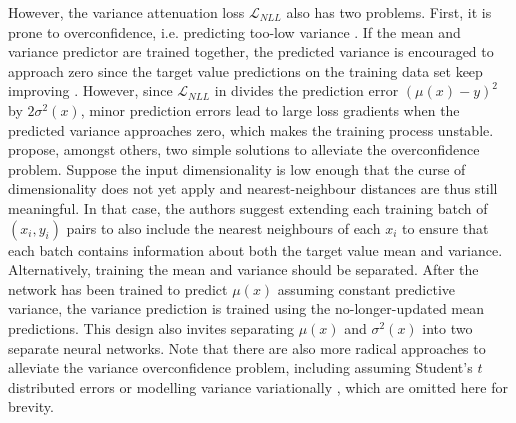 \newpar However, the variance attenuation loss $\mathcal{L}_{NLL}$ also has two problems. First, it is prone to overconfidence, i.e. predicting too-low variance \cite{reliable-variance-2019}. If the mean and variance predictor are trained together, the predicted variance is encouraged to approach zero since the target value predictions on the training data set keep improving \cite{variational-variance-2020}. However, since $\mathcal{L}_{NLL}$ in  divides the prediction error $(\mu(x) - y)^2$ by $2 \sigma^2(x)$, minor prediction errors lead to large loss gradients when the predicted variance approaches zero, which makes the training process unstable. \textcite{reliable-variance-2019} propose, amongst others, two simple solutions to alleviate the overconfidence problem. Suppose the input dimensionality is low enough that the curse of dimensionality does not yet apply and nearest-neighbour distances are thus still meaningful. In that case, the authors suggest extending each training batch of $(x_i, y_i)$ pairs to also include the nearest neighbours of each $x_i$ to ensure that each batch contains information about both the target value mean and variance. Alternatively, training the mean and variance should be separated. After the network has been trained to predict $\mu(x)$ assuming constant predictive variance, the variance prediction is trained using the no-longer-updated mean predictions. This design also invites separating $\mu(x)$ and $\sigma^2(x)$ into two separate neural networks. Note that there are also more radical approaches to alleviate the variance overconfidence problem, including assuming Student's $t$ distributed errors \cite{reliable-variance-2019} or modelling variance variationally \cite{variational-variance-2020}, which are omitted here for brevity.


